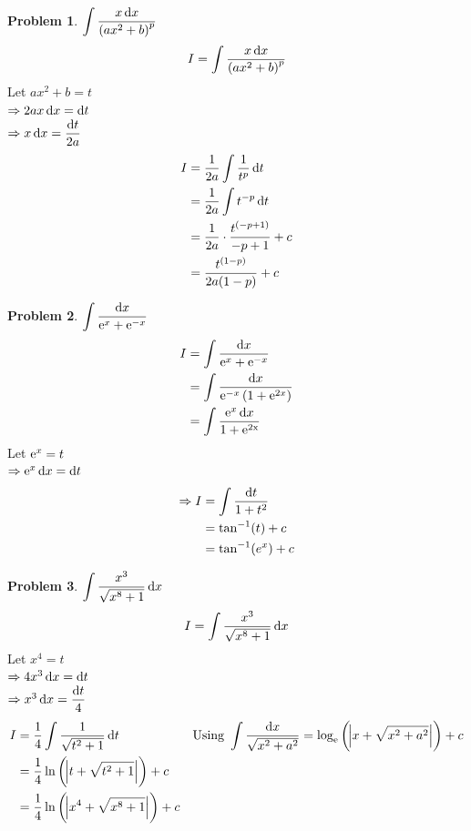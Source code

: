 \documentclass[14]{article}
\theoremstyle{definition}
\newtheorem{prob}{Problem}
\theoremstyle{case}
\begin{document}
\begin{prob}
$\displaystyle\int \dfrac{x \dif x}{\left(ax^2 + b\right)^p}$
\[I = \int \dfrac{x \dif x}{\left(ax^2 + b\right)^p}\]
Let $ax^2 + b = t$\\
$\Rightarrow 2ax \dif x = \dif t$\\
$\Rightarrow x \dif x = \dfrac{\dif t}{2a}$
\begin{align*}
I &= \dfrac1{2a} \int \dfrac{1}{t^p}\dif t\\
&= \dfrac1{2a} \int t^{-p} \dif t\\
&= \dfrac1{2a} \cdot \dfrac{t^{(-p+1)}}{-p+1} + c\\
&= \dfrac{t^{(1-p)}}{2a(1-p)}+c
\end{align*}
\end{prob}
\pagebreak
\begin{prob}
$\displaystyle\int \dfrac{\dif x}{{\rm e}^x + {\rm e}^{-x}}$
\begin{align*}
I &= \int \dfrac{\dif x}{{\rm e}^x + {\rm e}^{-x}}\\
&= \int \dfrac{\dif x}{{\rm e}^{-x} \left( 1+ {\rm e}^{2x} \right)}\\
&= \int \dfrac{{\rm e}^{x} \dif x}{1 + {\rm e^{2x}}}
\end{align*}
Let ${\rm e}^x = t$\\
$\Rightarrow {\rm e}^{x} \dif x = \dif t$
\begin{align*}
\Rightarrow I &= \int \dfrac{\dif t}{1 + t^2}\\
&= \tan^{-1}(t) + c\\
&= \tan^{-1}(e^x) + c
\end{align*}
\end{prob}
\begin{prob}
$\displaystyle\int \dfrac{x^3}{\sqrt{x^8 + 1}} \dif x$
\[I = \int \dfrac{x^3}{\sqrt{x^8 + 1}} \dif x\]
Let $x^4 = t$\\
$\Rightarrow 4x^3 \dif x = \dif t$\\
$\Rightarrow x^3 \dif x = \dfrac{\dif t}{4}$
\begin{align*}
I &= \dfrac14 \int\dfrac{1}{\sqrt{t^2 + 1}} \dif t && \text{Using } \int \dfrac{\dif x}{\sqrt{x^2 + a^2}} = \log_{\rm e} \left(\abs{x + \sqrt{x^2 + a^2}} \right) + c\\
&= \dfrac14 \ln\left( \abs{t + \sqrt{t^2 + 1}} \right) + c\\
&= \dfrac14 \ln \left( \abs{x^4 + \sqrt{x^8 + 1}} \right) + c
\end{align*}
\end{prob}
\pagebreak
\end{document}
